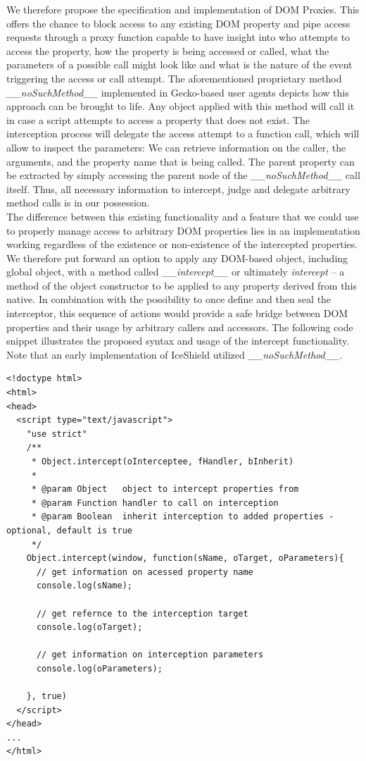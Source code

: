     We therefore propose the specification and implementation of DOM Proxies. This offers the chance to block access to any existing DOM property and pipe access requests through a proxy function capable to have insight into who attempts to access the property, how the property is being accessed or called, what the parameters of a possible call might look like and what is the nature of the event triggering the access or call attempt. The aforementioned proprietary method \textit{\_\_noSuchMethod\_\_} implemented in Gecko-based user agents depicts how this approach can be brought to life. Any object applied with this method will call it in case a script attempts to access a property that does not exist. The interception process will delegate the access attempt to a function call, which will allow to inspect the parameters: We can retrieve information on the caller, the arguments, and the property name that is being called. The parent property can be extracted by simply accessing the parent node of the \textit{\_\_noSuchMethod\_\_} call itself. Thus, all necessary information to intercept, judge and delegate arbitrary method calls is in our possession.\\

    The difference between this existing functionality and a feature that we could use to properly manage access to arbitrary DOM properties lies in an implementation working regardless of the existence or non-existence of the intercepted properties. We therefore put forward an option to apply any DOM-based object, including global object, with a method called \textit{\_\_intercept\_\_} or ultimately \textit{intercept} -- a method of the object constructor to be applied to any property derived from this native. In combination with the possibility to once define and then seal the interceptor, this sequence of actions would provide a safe bridge between DOM properties and their usage by arbitrary callers and accessors. The following code snippet illustrates the proposed syntax and usage of the intercept functionality. 
    Note that an early implementation of IceShield utilized \textit{\_\_noSuchMethod\_\_}.\\

\begin{lstlisting}[captionpos=b,label=lst:object-intercept,caption=Example code for the proposed Object.intercept() usage syntax]
<!doctype html>
<html>
<head>
  <script type="text/javascript">
    "use strict"
    /**
     * Object.intercept(oInterceptee, fHandler, bInherit)
     * 
     * @param Object   object to intercept properties from
     * @param Function handler to call on interception
     * @param Boolean  inherit interception to added properties - optional, default is true
     */
    Object.intercept(window, function(sName, oTarget, oParameters){
      // get information on acessed property name
      console.log(sName);

      // get refernce to the interception target
      console.log(oTarget);

      // get information on interception parameters
      console.log(oParameters);

    }, true)
  </script>
</head>
...
</html>
\end{lstlisting}
 
